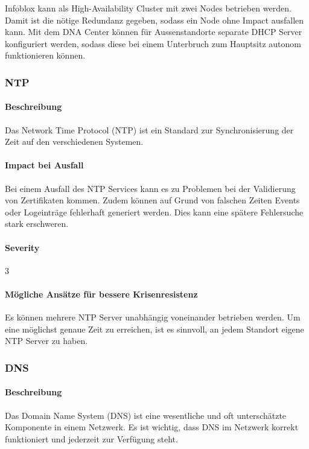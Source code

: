 Infoblox kann als High-Availability Cluster mit zwei Nodes betrieben werden. Damit ist die nötige Redundanz gegeben, sodass ein Node ohne Impact ausfallen kann. Mit dem DNA Center können für Aussenstandorte separate DHCP Server konfiguriert werden, sodass diese bei einem Unterbruch zum Hauptsitz autonom funktionieren können.


\subsubsection{NTP}
\paragraph{Beschreibung}
Das Network Time Protocol (NTP) ist ein Standard zur Synchronisierung der Zeit auf den verschiedenen Systemen.

\paragraph{Impact bei Ausfall}
Bei einem Ausfall des NTP Services kann es zu Problemen bei der Validierung von Zertifikaten kommen. Zudem können auf Grund von falschen Zeiten Events oder Logeinträge fehlerhaft generiert werden. Dies kann eine spätere Fehlersuche stark erschweren.

\paragraph{Severity} 3

\paragraph{Mögliche Ansätze für bessere Krisenresistenz}
Es können mehrere NTP Server unabhängig voneinander betrieben werden. Um eine möglichst genaue Zeit zu erreichen, ist es sinnvoll, an jedem Standort eigene NTP Server zu haben.

\subsubsection{DNS}
\paragraph{Beschreibung}
Das Domain Name System (DNS) ist eine wesentliche und oft unterschätzte Komponente in einem Netzwerk. Es ist wichtig, dass DNS im Netzwerk korrekt funktioniert und jederzeit zur Verfügung steht.

